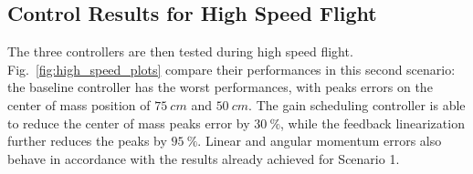 \subsection{Control Results for High Speed Flight}
\label{subsec:ctrl-results-aerodyn}

The three controllers are then tested during high speed flight. Fig.~\ref{fig:high_speed_plots} compare their performances in this second scenario: the baseline controller has the worst performances, with peaks errors on the center of mass position of $\SI{75}{cm}$ and $\SI{50}{cm}$. The gain scheduling controller is able to reduce the center of mass peaks error by $\SI{30}{\%}$, while the feedback linearization further reduces the peaks by $\SI{95}{\%}$. Linear and angular momentum errors also behave in accordance with the results already achieved for Scenario 1.



